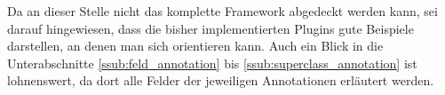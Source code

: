 \documentclass[a4paper, 11pt]{article} %
\begin{document}
Da an dieser Stelle nicht das komplette Framework abgedeckt werden kann, sei darauf hingewiesen, dass die bisher implementierten Plugins gute Beispiele darstellen, an denen man sich orientieren kann. Auch ein Blick in die Unterabschnitte \ref{ssub:feld_annotation} bis \ref{ssub:superclass_annotation} ist lohnenswert, da dort alle Felder der jeweiligen Annotationen erläutert werden.




\newpage




\end{document}
